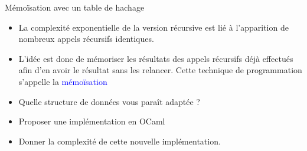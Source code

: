 \documentclass[10pt]{beamer}
\begin{document}
\begin{frame}{\Ctitle}{\stitle}
	\begin{block}{Mémoïsation avec un table de hachage}
		\begin{itemize}
	\item<1-> La complexité exponentielle de la version récursive est lié à l'apparition de nombreux appels récursifs identiques. 
	\item<2-> L'idée est donc de mémoriser les résultats des appels récursifs déjà effectués afin d'en avoir le résultat sans les relancer. Cette technique de programmation s'appelle la \textcolor{blue}{mémoïsation}
	\item<3-> Quelle structure de données vous paraît adaptée ?
	\item<4-> Proposer une implémentation en OCaml
	\item<5-> Donner la complexité de cette nouvelle implémentation.
		\end{itemize}
	\end{block}
\end{frame}
\end{document}
